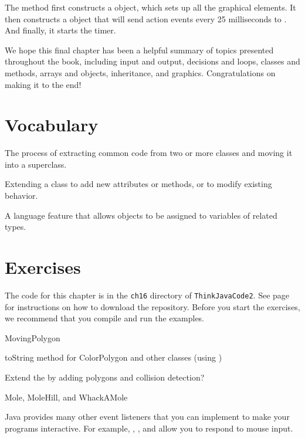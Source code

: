 The  method first constructs a  object, which sets up all the graphical elements.
It then constructs a  object that will send action events every 25 milliseconds to .
And finally, it starts the timer.

We hope this final chapter has been a helpful summary of topics presented throughout the book, including input and output, decisions and loops, classes and methods, arrays and objects, inheritance, and graphics.
Congratulations on making it to the end!


\section{Vocabulary}

\begin{description}

The process of extracting common code from two or more classes and moving it into a superclass.

Extending a class to add new attributes or methods, or to modify existing behavior.

A language feature that allows objects to be assigned to variables of related types.

\end{description}


\section{Exercises}

The code for this chapter is in the {\tt ch16} directory of {\tt ThinkJavaCode2}.
See page~\pageref{code} for instructions on how to download the repository.
Before you start the exercises, we recommend that you compile and run the examples.


\begin{exercise}
MovingPolygon
\end{exercise}


\begin{exercise}
toString method for ColorPolygon and other classes (using )
\end{exercise}


\begin{exercise}
Extend the  by adding polygons and collision detection?
\end{exercise}


\begin{exercise}
Mole, MoleHill, and WhackAMole

Java provides many other event listeners that you can implement to make your programs interactive.
For example, , , and  allow you to respond to mouse input.
\end{exercise}
